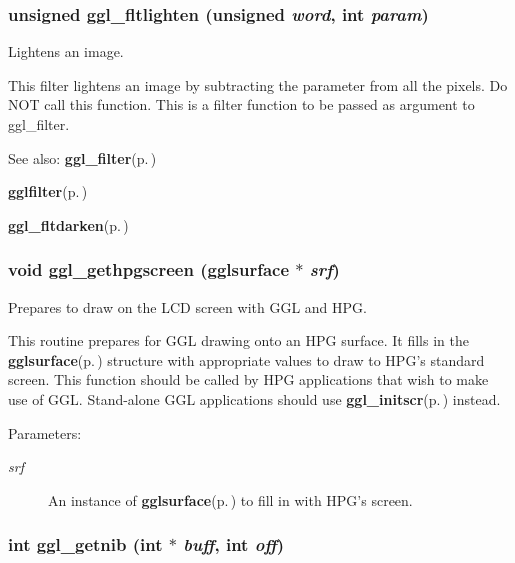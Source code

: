\subsubsection{\setlength{\rightskip}{0pt plus 5cm}unsigned ggl\_\-fltlighten (unsigned {\em word}, int {\em param})}\label{ggl_8h_a28}


Lightens an image. 

This filter lightens an image by subtracting the parameter from all the pixels. Do NOT call this function. This is a filter function to be passed as argument to ggl\_\-filter.

\begin{Desc}
\item[See also:]{\bf ggl\_\-filter}{\rm (p.\,\pageref{ggl_8h_a26})} 

{\bf gglfilter}{\rm (p.\,\pageref{ggl_8h_a7})} 

{\bf ggl\_\-fltdarken}{\rm (p.\,\pageref{ggl_8h_a29})} \end{Desc}
\subsubsection{\setlength{\rightskip}{0pt plus 5cm}void ggl\_\-gethpgscreen ({\bf gglsurface} $\ast$ {\em srf})}\label{ggl_8h_a10}


Prepares to draw on the LCD screen with GGL and HPG. 

This routine prepares for GGL drawing onto an HPG surface. It fills in the {\bf gglsurface}{\rm (p.\,\pageref{structgglsurface})} structure with appropriate values to draw to HPG's standard screen. This function should be called by HPG applications that wish to make use of GGL. Stand-alone GGL applications should use {\bf ggl\_\-initscr}{\rm (p.\,\pageref{ggl_8h_a9})} instead.

\begin{Desc}
\item[Parameters:]
\begin{description}
\item[{\em srf}]An instance of {\bf gglsurface}{\rm (p.\,\pageref{structgglsurface})} to fill in with HPG's screen. \end{description}
\end{Desc}
\subsubsection{\setlength{\rightskip}{0pt plus 5cm}int ggl\_\-getnib (int $\ast$ {\em buff}, int {\em off})}\label{ggl_8h_a14}


